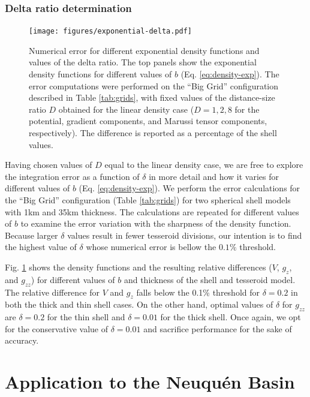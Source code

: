\documentclass[extra, referee]{gji}
\begin{document}
\subsubsection{Delta ratio determination}

\begin{figure}
\centering
\texttt{[image: figures/exponential-delta.pdf]}
\caption{
    Numerical error for different exponential density functions and values of the delta
    ratio.
    The top panels show the exponential density functions for different values of $b$
    (Eq. \ref{eq:density-exp}).
    The error computations were performed on the ``Big Grid'' configuration described in
    Table \ref{tab:grids}, with fixed values of the distance-size ratio
    $D$ obtained for the linear density case ($D=1, 2, 8$ for the
    potential, gradient components, and Marussi tensor components, respectively).
    The difference is reported as a percentage of the shell values.
    }
\label{fig:delta-exponential}
\end{figure}

Having chosen values of $D$ equal to the linear density case, we are free to explore the
integration error as a function of $\delta$ in more detail and how it varies for
different values of $b$ (Eq. \ref{eq:density-exp}).
We perform the error calculations for the ``Big Grid'' configuration (Table
\ref{tab:grids}) for two spherical shell models with 1km and 35km thickness.
The calculations are repeated for different values of $b$ to examine the error variation
with the sharpness of the density function.
Because larger $\delta$ values result in fewer tesseroid divisions,
our intention is to find the highest value of $\delta$ whose numerical error is bellow
the $0.1\%$ threshold.

Fig. \ref{fig:delta-exponential} shows the density functions and the resulting relative
differences ($V$, $g_z$, and $g_{zz}$) for different values of $b$ and thickness of the
shell and tesseroid model.
The relative difference for $V$ and $g_z$ falls below the 0.1\% threshold for
$\delta = 0.2$ in both the thick and thin shell cases.
On the other hand, optimal values of $\delta$ for $g_{zz}$
are $\delta = 0.2$ for the thin shell and $\delta = 0.01$ for the thick shell.
Once again, we opt for the conservative value of $\delta = 0.01$ and sacrifice
performance for the sake of accuracy.



\section{Application to the Neuqu\'en Basin}
\end{document}
